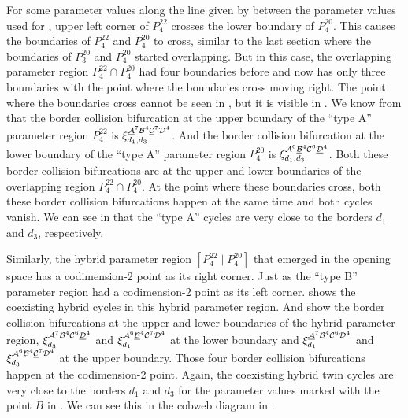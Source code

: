 For some parameter values along the line given by  between the parameter values used for , upper left corner of $P^{22}_4$ crosses the lower boundary of $P^{20}_4$.
This causes the boundaries of $P^{22}_4$ and $P^{20}_4$ to cross, similar to the last section where the boundaries of $P^{20}_3$ and $P^{20}_4$ started overlapping.
But in this case, the overlapping parameter region $P^{22}_4 \cap P^{20}_4$ had four boundaries before and now has only three boundaries with the point where the boundaries cross moving right.
The point where the boundaries cross cannot be seen in , but it is visible in .
We know from  that the border collision bifurcation at the upper boundary of the ``type A'' parameter region $P^{22}_4$ is $\xi_{d_1, d_3}^{\underline{\mathcal{A}}^7\mathcal{B}^4\underline{\mathcal{C}}^7\mathcal{D}^4}$.
And the border collision bifurcation at the lower boundary of the ``type A'' parameter region $P^{20}_4$ is $\xi_{d_1, d_3}^{\mathcal{A}^6\underline{\mathcal{B}}^4\mathcal{C}^6\underline{\mathcal{D}}^4}$.
Both these border collision bifurcations are at the upper and lower boundaries of the overlapping region $P^{22}_4 \cap P^{20}_4$.
At the point where these boundaries cross, both these border collision bifurcations happen at the same time and both cycles vanish.
We can see in  that the ``type A'' cycles are very close to the borders $d_1$ and $d_3$, respectively.

Similarly, the hybrid parameter region $\left[P^{22}_4 \mid P^{20}_4\right]$ that emerged in the opening space has a codimension-2 point as its right corner.
Just as the ``type B'' parameter region had a codimension-2 point as its left corner.
 shows the coexisting hybrid cycles in this hybrid parameter region.
And  show the border collision bifurcations at the upper and lower boundaries of the hybrid parameter region, $\xi_{d_3}^{\mathcal{A}^7\mathcal{B}^4\mathcal{C}^6\underline{\mathcal{D}}^4}$ and $\xi_{d_1}^{\mathcal{A}^6\underline{\mathcal{B}}^4\mathcal{C}^7\mathcal{D}^4}$ at the lower boundary and $\xi_{d_1}^{\underline{\mathcal{A}}^7\mathcal{B}^4\mathcal{C}^6\mathcal{D}^4}$ and $\xi_{d_3}^{\mathcal{A}^6\mathcal{B}^4\underline{\mathcal{C}}^7\mathcal{D}^4}$ at the upper boundary.
Those four border collision bifurcations happen at the codimension-2 point.
Again, the coexisting hybrid twin cycles are very close to the borders $d_1$ and $d_3$ for the parameter values marked with the point $B$ in .
We can see this in the cobweb diagram in .

